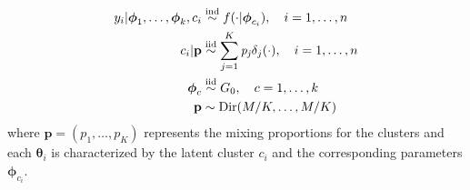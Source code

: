\begin{equation}
	\begin{aligned}\label{dpm-disc}
		y_{i}|\boldsymbol{\phi}_1,\dots,\boldsymbol{\phi}_k,c_{i} &\stackrel{\text{ind}}{\sim} f(\cdot|\boldsymbol\phi_{c_{i}}), \quad i=1,\dots,n \\
		c_{i}|\mathit{\mathbf{p}}&\stackrel{\text{iid}}{\sim} \sum_{j=1}^K\mathit{p_j} \delta_j(\cdot), \quad i=1,\dots,n \\
		\boldsymbol\phi_{c} & \stackrel{\text{iid}}{\sim} G_{0}, \quad c=1,\dots,k \\
		\mathbf{p} &\sim \operatorname{Dir}(M/K,\dots,M/K)
	\end{aligned}
\end{equation}
where $\mathbf{p}=(p_1,\dots,p_K)$ represents the mixing proportions for the clusters and each $\boldsymbol\theta_i$ is characterized by the latent cluster $c_i$ and the corresponding parameters $\boldsymbol\phi_{c_i}$.

